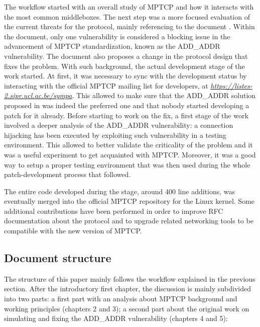 The workflow started with an overall study of MPTCP and how it interacts with the most common middleboxes. The next step was a more focused evaluation of the current threats for the protocol, mainly referencing to the document . Within the document, only one vulnerability is considered a blocking issue in the advancement of MPTCP standardization, known as the ADD\_ADDR vulnerability. The document also proposes a change in the protocol design that fixes the problem. With such background, the actual development stage of the work started. At first, it was necessary to sync with the development status by interacting with the official MPTCP mailing list for developers, at \href{https://listes-2.sipr.ucl.ac.be/sympa}{\textit{https://listes-2.sipr.ucl.ac.be/sympa}}. This allowed to make sure that the ADD\_ADDR solution proposed in  was indeed the preferred one and that nobody started developing a patch for it already.
Before starting to work on the fix, a first stage of the work involved a deeper analysis of the ADD\_ADDR vulnerability: a connection hijacking has been executed by exploiting such vulnerability in a testing environment. This allowed to better validate the criticality of the problem and it was a useful experiment to get acquainted with MPTCP. Moreover, it was a good way to setup a proper testing environment that was then used during the whole patch-development process that followed.

The entire code developed during the stage, around 400 line additions, was eventually merged into the official MPTCP repository for the Linux kernel. Some additional contributions have been performed in order to improve RFC documentation about the protocol and to upgrade related networking tools to be compatible with the new version of MPTCP.

\subsection{Document structure}
The structure of this paper mainly follows the workflow explained in the previous section. After the introductory first chapter, the discussion is mainly subdivided into two parts: a first part with an analysis about MPTCP background and working principles (chapters 2 and 3); a second part about the original work on simulating and fixing the ADD\_ADDR vulnerability (chapters 4 and 5):


